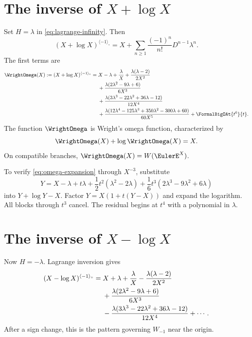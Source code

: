 \documentclass[11pt,openany]{book}
\theoremstyle{definition}
\theoremstyle{plain}
\theoremstyle{remark}
\newcommand{\invcomp}{^{\langle -1\rangle_{\circ}}}
\begin{document}
\section{The inverse of \texorpdfstring{\(X+\log X\)}{X+log X}}
Set \(H=\lambda\) in \cref{eq:lagrange-infinity}. Then
\begin{equation}\label{eq:omega-lagrange}
 (X+\log X)\invcomp
 =X+\sum_{n\ge1}\frac{(-1)^n}{n!}D^{n-1}\lambda^n.
\end{equation}
The first terms are
\begin{align}
 \WrightOmega(X):=(X+\log X)\invcomp
 ={}&X-\lambda+\frac{\lambda}{X}
 +\frac{\lambda(\lambda-2)}{2X^2}\notag\\
 &+\frac{\lambda(2\lambda^2-9\lambda+6)}{6X^3}\notag\\
 &+\frac{\lambda(3\lambda^3-22\lambda^2+36\lambda-12)}{12X^4}\notag\\
 &+\frac{\lambda(12\lambda^4-125\lambda^3+350\lambda^2-300\lambda+60)}{60X^5}
 +\FormalBigOAt{t^6}{t}.
\label{eq:omega-expansion}
\end{align}
The function \(\WrightOmega\) is Wright's omega function, characterized by
\begin{equation}\label{eq:omega-equation}
 \WrightOmega(X)+\log\WrightOmega(X)=X.
\end{equation}
On compatible branches, \(\WrightOmega(X)=W(\EulerE^X)\).

\begin{workedbox}
To verify \cref{eq:omega-expansion} through \(X^{-3}\), substitute
\[
 Y=X-\lambda+t\lambda
 +\frac12t^2(\lambda^2-2\lambda)
 +\frac16t^3(2\lambda^3-9\lambda^2+6\lambda)
\]
into \(Y+\log Y-X\). Factor \(Y=X(1+t(Y-X))\) and expand the logarithm. All blocks through \(t^3\) cancel. The residual begins at \(t^4\) with a polynomial in \(\lambda\).
\end{workedbox}

\section{The inverse of \texorpdfstring{\(X-\log X\)}{X-log X}}
Now \(H=-\lambda\). Lagrange inversion gives
\begin{align}
 (X-\log X)\invcomp
 ={}&X+\lambda+\frac{\lambda}{X}
 -\frac{\lambda(\lambda-2)}{2X^2}\notag\\
 &+\frac{\lambda(2\lambda^2-9\lambda+6)}{6X^3}\notag\\
 &-\frac{\lambda(3\lambda^3-22\lambda^2+36\lambda-12)}{12X^4}
 +\cdots.
\label{eq:inverse-X-minus-log}
\end{align}
After a sign change, this is the pattern governing \(W_{-1}\) near the origin.
\end{document}
